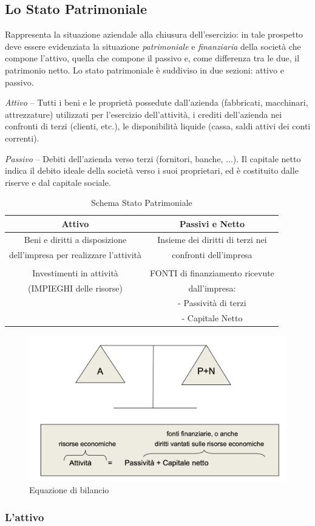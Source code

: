 \subsection{Lo Stato Patrimoniale}
Rappresenta la situazione aziendale alla chiusura dell’esercizio: in tale prospetto deve essere evidenziata la situazione \textit{patrimoniale} e \textit{finanziaria} della società che compone l’attivo, quella che compone il passivo e, come differenza tra le due, il patrimonio netto. Lo stato patrimoniale è suddiviso in due sezioni: attivo e passivo.

\textit{Attivo} – Tutti i beni e le proprietà possedute dall’azienda (fabbricati, macchinari, attrezzature) utilizzati per l’esercizio dell’attività, i crediti dell’azienda nei confronti di terzi (clienti, etc.), le disponibilità liquide (cassa, saldi attivi dei conti correnti).

\textit{Passivo} – Debiti dell’azienda verso terzi (fornitori, banche, ...). Il capitale netto indica il debito ideale della società verso i suoi proprietari, ed è costituito dalle riserve e dal capitale sociale.

\begin{table}[H]
	\begin{tabular}{| c | c |}
		\hline
		 Attivo & Passivi e Netto \\
		 \hline
		 Beni e diritti a disposizione & Insieme dei diritti di terzi nei \\
		 dell’impresa per realizzare l’attività &  confronti dell’impresa \\
		 & \\
		 Investimenti in attività & FONTI di finanziamento ricevute \\
		 (IMPIEGHI delle risorse) &  dall’impresa: \\ 
		 & - Passività di terzi \\ 
		 & - Capitale Netto \\
		 \hline
	\end{tabular}
	\centering
	\caption{Schema Stato Patrimoniale}
\end{table}

\begin{figure}[H]
	\includegraphics[width=0.8\linewidth]{resources/chapters/Bilancio/images/equazione-bilancio.png}
	\centering
	\caption{Equazione di bilancio}
\end{figure}

\subsubsection{L'attivo}